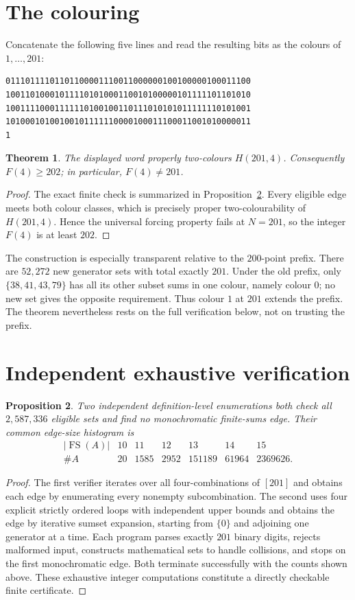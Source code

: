 \documentclass[11pt]{amsart}
\newtheorem{theorem}{Theorem}
\newtheorem{proposition}[theorem]{Proposition}
\begin{document}
\section{The colouring}
Concatenate the following five lines and read the resulting bits as the colours
of $1,\ldots,201$:
\begin{verbatim}
01110111101101100001110011000000100100000100011100
10011010001011110101000110010100000101111101101010
10011110001111110100100110111010101011111110101001
10100010100100101111110000100011100011001010000011
1
\end{verbatim}

\begin{theorem}\label{thm:main}
The displayed word properly two-colours $H(201,4)$.  Consequently
$F(4)\geq202$; in particular, $F(4)\ne201$.
\end{theorem}

\begin{proof}
The exact finite check is summarized in Proposition~\ref{prop:verification}.
Every eligible edge meets both colour classes, which is precisely proper
two-colourability of $H(201,4)$.  Hence the universal forcing property fails
at $N=201$, so the integer $F(4)$ is at least $202$.
\end{proof}

The construction is especially transparent relative to the $200$-point
prefix.  There are $52{,}272$ new generator sets with total exactly $201$.
Under the old prefix, only $\{38,41,43,79\}$ has all its other subset sums in
one colour, namely colour $0$; no new set gives the opposite requirement.
Thus colour $1$ at $201$ extends the prefix.  The theorem nevertheless rests
on the full verification below, not on trusting the prefix.

\section{Independent exhaustive verification}
\begin{proposition}\label{prop:verification}
Two independent definition-level enumerations both check all $2{,}587{,}336$
eligible sets and find no monochromatic finite-sums edge.  Their common
edge-size histogram is
\[
\begin{array}{c|rrrrrr}
|\operatorname{FS}(A)|&10&11&12&13&14&15\\ \hline
\#A&20&1585&2952&151189&61964&2369626.
\end{array}
\]
\end{proposition}
\begin{proof}
The first verifier iterates over all four-combinations of $[201]$ and obtains
each edge by enumerating every nonempty subcombination.  The second uses four
explicit strictly ordered loops with independent upper bounds and obtains the
edge by iterative sumset expansion, starting from $\{0\}$ and adjoining one
generator at a time.  Each program parses exactly $201$ binary digits, rejects
malformed input, constructs mathematical sets to handle collisions, and stops
on the first monochromatic edge.  Both terminate successfully with the counts
shown above.  These exhaustive integer computations constitute a directly
checkable finite certificate.
\end{proof}
\end{document}
